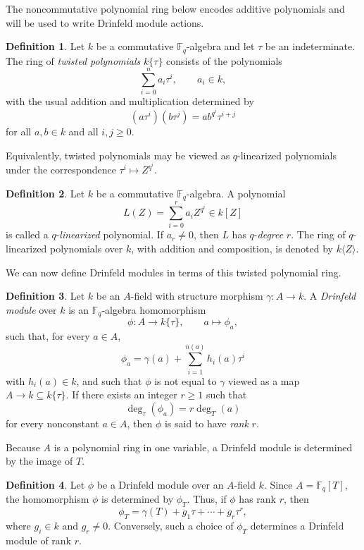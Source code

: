\documentclass[10pt,a4paper]{amsart}
\theoremstyle{definition}
\newtheorem{definition}{Definition}[section]
\theoremstyle{plain}
\theoremstyle{remark}
\newcommand{\vF}{\mathbb F}
\begin{document}
The noncommutative polynomial ring below encodes additive polynomials and will be used to write Drinfeld module actions.

\begin{definition}
Let $k$ be a commutative $\vF_q$-algebra and let $\tau$ be an indeterminate. The ring of \emph{twisted polynomials} $k\{\tau\}$ consists of the polynomials
$$
\sum_{i=0}^n a_i\tau^i,
\qquad a_i\in k,
$$
with the usual addition and multiplication determined by
$$
(a\tau^i)(b\tau^j)=ab^{q^i}\tau^{i+j}
$$
for all $a,b\in k$ and all $i,j\geq 0$.
\end{definition}

Equivalently, twisted polynomials may be viewed as $q$-linearized polynomials under the correspondence $\tau^i\mapsto Z^{q^i}$.

\begin{definition}
Let $k$ be a commutative $\vF_q$-algebra. A polynomial
$$
L(Z)=\sum_{i=0}^r a_iZ^{q^i}\in k[Z]
$$
is called a $q$-\emph{linearized} polynomial. If $a_r\neq 0$, then $L$ has $q$-\emph{degree} $r$. The ring of $q$-linearized polynomials over $k$, with addition and composition, is denoted by $k\langle Z\rangle$.
\end{definition}

We can now define Drinfeld modules in terms of this twisted polynomial ring.

\begin{definition}
Let $k$ be an $A$-field with structure morphism $\gamma:A\rightarrow k$. A \emph{Drinfeld module} over $k$ is an $\vF_q$-algebra homomorphism
$$
\phi:A\longrightarrow k\{\tau\},
\qquad
a\longmapsto \phi_a,
$$
such that, for every $a\in A$,
$$
\phi_a=\gamma(a)+\sum_{i=1}^{n(a)}h_i(a)\tau^i
$$
with $h_i(a)\in k$, and such that $\phi$ is not equal to $\gamma$ viewed as a map $A\rightarrow k\subseteq k\{\tau\}$. If there exists an integer $r\geq 1$ such that
$$
\deg_\tau(\phi_a)=r\deg_T(a)
$$
for every nonconstant $a\in A$, then $\phi$ is said to have \emph{rank} $r$.
\end{definition}

Because $A$ is a polynomial ring in one variable, a Drinfeld module is determined by the image of $T$.

\begin{definition}
Let $\phi$ be a Drinfeld module over an $A$-field $k$. Since $A=\vF_q[T]$, the homomorphism $\phi$ is determined by $\phi_T$. Thus, if $\phi$ has rank $r$, then
$$
\phi_T=\gamma(T)+g_1\tau+\cdots+g_r\tau^r,
$$
where $g_i\in k$ and $g_r\neq 0$. Conversely, such a choice of $\phi_T$ determines a Drinfeld module of rank $r$.
\end{definition}
\end{document}
